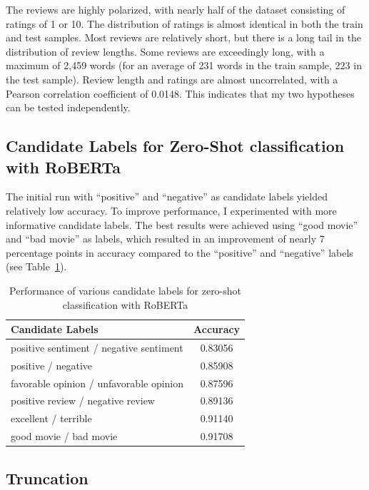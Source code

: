 \documentclass{article}
\begin{document}
The reviews are highly polarized, with nearly half of the dataset consisting of ratings of 1 or 10. The distribution of ratings is almost identical in both the train and test samples. Most reviews are relatively short, but there is a long tail in the distribution of review lengths. Some reviews are exceedingly long, with a maximum of 2,459 words (for an average of 231 words in the train sample, 223 in the test sample). Review length and ratings are almost uncorrelated, with a Pearson correlation coefficient of 0.0148. This indicates that my two hypotheses can be tested independently.

\subsection{Candidate Labels for Zero-Shot classification with RoBERTa}

The initial run with \enquote{positive} and \enquote{negative} as candidate labels yielded relatively low accuracy. To improve performance, I experimented with more informative candidate labels. The best results were achieved using \enquote{good movie} and \enquote{bad movie} as labels, which resulted in an improvement of nearly 7 percentage points in accuracy compared to the \enquote{positive} and \enquote{negative} labels (see Table~\ref{tab:labels_zero_shot}).

\begin{table}
  \caption{Performance of various candidate labels for zero-shot classification with RoBERTa}
  \label{tab:labels_zero_shot}
  \centering
  \begin{tabular}{lc}
    \toprule
    \textbf{Candidate Labels} & \textbf{Accuracy} \\
    \midrule
    positive sentiment / negative sentiment & 0.83056 \\
    positive / negative & 0.85908 \\
    favorable opinion / unfavorable opinion & 0.87596 \\
    positive review / negative review & 0.89136 \\
    excellent / terrible & 0.91140 \\
    good movie / bad movie & 0.91708 \\
    \bottomrule
  \end{tabular}
\end{table}

\subsection{Truncation}
\end{document}

